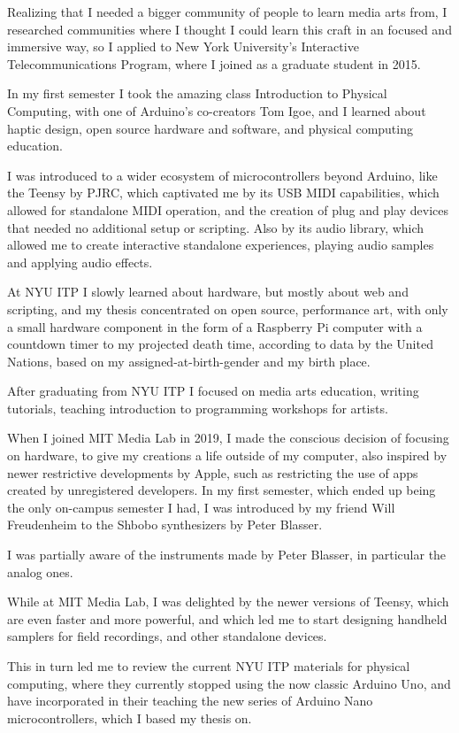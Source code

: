Realizing that I needed a bigger community of people to learn media arts from, I researched communities where I thought I could learn this craft in an focused and immersive way, so I applied to New York University's Interactive Telecommunications Program, where I joined as a graduate student in 2015.

In my first semester I took the amazing class Introduction to Physical Computing, with one of Arduino's co-creators Tom Igoe, and I learned about haptic design, open source hardware and software, and physical computing education.

I was introduced to a wider ecosystem of microcontrollers beyond Arduino, like the Teensy by PJRC, which captivated me by its USB MIDI capabilities, which allowed for standalone MIDI operation, and the creation of plug and play devices that needed no additional setup or scripting. Also by its audio library, which allowed me to create interactive standalone experiences, playing audio samples and applying audio effects.

At NYU ITP I slowly learned about hardware,  but mostly about web and scripting, and my thesis concentrated on open source, performance art, with only a small hardware component in the form of a Raspberry Pi computer with a countdown timer to my projected death time, according to data by the United Nations, based on my assigned-at-birth-gender and my birth place.

After graduating from NYU ITP I focused on media arts education, writing tutorials, teaching introduction to programming workshops for artists.

When I joined MIT Media Lab in 2019, I made the conscious decision of focusing on hardware, to give my creations a life outside of my computer, also inspired by newer restrictive developments by Apple, such as restricting the use of apps created by unregistered developers. In my first semester, which ended up being the only on-campus semester I had, I was introduced by my friend Will Freudenheim to the Shbobo synthesizers by Peter Blasser.

I was partially aware of the instruments made by Peter Blasser, in particular the analog ones.

While at MIT Media Lab, I was delighted by the newer versions of Teensy, which are even faster and more powerful, and which led me to start designing handheld samplers for field recordings, and other standalone devices.

This in turn led me to review the current NYU ITP materials for physical computing, where they currently stopped using the now classic Arduino Uno, and have incorporated in their teaching the new series of Arduino Nano microcontrollers, which I based my thesis on.

